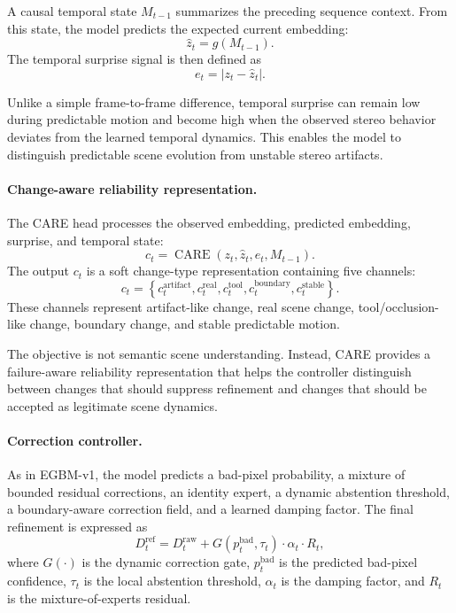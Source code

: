 \documentclass[11pt,a4paper]{article}
\begin{document}
A causal temporal state $M_{t-1}$ summarizes the preceding sequence context.
From this state, the model predicts the expected current embedding:
\begin{equation}
    \hat{z}_t = g(M_{t-1}).
\end{equation}
The temporal surprise signal is then defined as
\begin{equation}
    e_t = \left|z_t - \hat{z}_t\right|.
\end{equation}

Unlike a simple frame-to-frame difference, temporal surprise can remain low
during predictable motion and become high when the observed stereo behavior
deviates from the learned temporal dynamics. This enables the model to
distinguish predictable scene evolution from unstable stereo artifacts.

\paragraph{Change-aware reliability representation.}
The CARE head processes the observed embedding, predicted embedding, surprise,
and temporal state:
\begin{equation}
    c_t =
    \operatorname{CARE}
    \left(
        z_t,
        \hat{z}_t,
        e_t,
        M_{t-1}
    \right).
\end{equation}
The output $c_t$ is a soft change-type representation containing five channels:
\begin{equation}
    c_t =
    \left\{
        c_t^{\mathrm{artifact}},
        c_t^{\mathrm{real}},
        c_t^{\mathrm{tool}},
        c_t^{\mathrm{boundary}},
        c_t^{\mathrm{stable}}
    \right\}.
\end{equation}
These channels represent artifact-like change, real scene change,
tool/occlusion-like change, boundary change, and stable predictable motion.

The objective is not semantic scene understanding. Instead, CARE provides a
failure-aware reliability representation that helps the controller distinguish
between changes that should suppress refinement and changes that should be
accepted as legitimate scene dynamics.

\paragraph{Correction controller.}
As in EGBM-v1, the model predicts a bad-pixel probability, a mixture of bounded
residual corrections, an identity expert, a dynamic abstention threshold, a
boundary-aware correction field, and a learned damping factor. The final
refinement is expressed as
\begin{equation}
    D_t^{\mathrm{ref}} =
    D_t^{\mathrm{raw}}
    +
    G
    \left(
        p_t^{\mathrm{bad}},
        \tau_t
    \right)
    \cdot
    \alpha_t
    \cdot
    R_t,
\end{equation}
where $G(\cdot)$ is the dynamic correction gate,
$p_t^{\mathrm{bad}}$ is the predicted bad-pixel confidence,
$\tau_t$ is the local abstention threshold,
$\alpha_t$ is the damping factor, and
$R_t$ is the mixture-of-experts residual.
\end{document}

